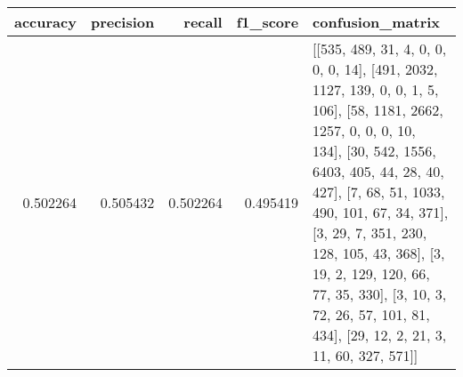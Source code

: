 \begin{tabular}{rrrrl}
\toprule
accuracy & precision & recall & f1_score & confusion_matrix \\
\midrule
0.502264 & 0.505432 & 0.502264 & 0.495419 & [[535, 489, 31, 4, 0, 0, 0, 0, 14], [491, 2032, 1127, 139, 0, 0, 1, 5, 106], [58, 1181, 2662, 1257, 0, 0, 0, 10, 134], [30, 542, 1556, 6403, 405, 44, 28, 40, 427], [7, 68, 51, 1033, 490, 101, 67, 34, 371], [3, 29, 7, 351, 230, 128, 105, 43, 368], [3, 19, 2, 129, 120, 66, 77, 35, 330], [3, 10, 3, 72, 26, 57, 101, 81, 434], [29, 12, 2, 21, 3, 11, 60, 327, 571]] \\
\bottomrule
\end{tabular}

